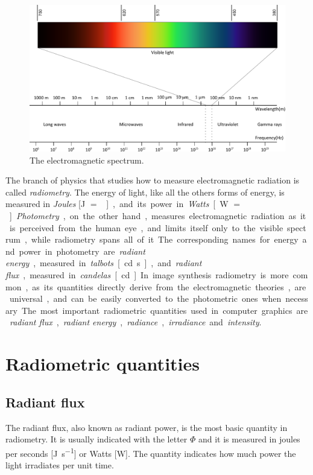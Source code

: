 \begin{figure}[!ht]
\centering
\includegraphics[width=1.0\textwidth]{images/spectrum.pdf}
\caption{The electromagnetic spectrum.}
\label{fig:spectrum}
\end{figure}

The branch of physics that studies how to measure electromagnetic radiation is called \emph{radiometry}. The energy of light, like all the others forms of energy, is measured in \emph{Joules} [\si{\joule} $=$ \si{\kg\meter\square\per\second\square}], and its power in \emph{Watts} [\si{\watt} $=$ \si{\kg\meter\square\per\second\cubed}]. \emph{Photometry}, on the other hand, measures electromagnetic radiation as it is perceived from the human eye, and limits itself only to the visible spectrum, while radiometry spans all of it. The corresponding names for energy and power in photometry are \emph{radiant energy}, measured in \emph{talbots} [\si{\candela\second}], and \emph{radiant flux}, measured in \emph{candelas} [\si{\candela}]. 

In image synthesis radiometry is more common, as its quantities directly derive from the electromagnetic theories, are universal, and can be easily converted to the photometric ones when necessary. The most important radiometric quantities used in computer graphics are \emph{radiant flux}, \emph{radiant energy}, \emph{radiance}, \emph{irradiance} and \emph{intensity}.

\section{Radiometric quantities}

\subsection{Radiant flux}
The radiant flux, also known as radiant power, is the most basic quantity in radiometry. It is usually indicated with the letter $\Phi$ and it is measured in joules per seconds [\si{\joule\per\second}] or Watts [\si{\watt}]. The quantity indicates how much power the light irradiates per unit time. 

